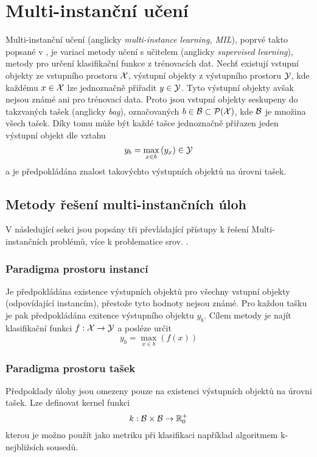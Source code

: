 \chapter{Multi-instanční učení}
Multi-instanční učení (anglicky \textenglish{\textit{multi-instance learning, MIL}}), poprvé takto popsané v \cite{dietterich_solving_1997}, je variací metody učení s učitelem (anglicky \textenglish{\textit{supervised learning}}), metody pro určení klasifikační funkce z trénovacích dat. Nechť existují vstupní objekty ze vstupního prostoru \( \mathcal X \), výstupní objekty z výstupního prostoru \( \mathcal Y \), kde každému \( x \in \mathcal X \) lze jednoznačně přiřadit \( y \in \mathcal Y \). Tyto výstupní objekty avšak nejsou známé ani pro trénovací data. Proto jsou vstupní objekty seskupeny do takzvaných tašek (anglicky \textenglish{\textit{bag}}), označovaných \( b \in \mathcal B \subset \mathcal P ( \mathcal X ) \), kde \( \mathcal B \) je množina všech tašek. Díky tomu může být každé tašce jednoznačně přiřazen jeden výstupní objekt dle vztahu
\begin{equation}\label{baglabel}
	y_b = \max_{x \in b} \left( y_x \right) \in \mathcal Y
\end{equation}
a je předpokládána znalost takovýchto výstupních objektů na úrovni tašek.

\section{Metody řešení multi-instančních úloh}

V následující sekci jsou popsány tři převládající přístupy k řešení Multi-instančních problémů, více k problematice srov. \cite{pevny_using_2016}.

\subsection{Paradigma prostoru instancí}
Je předpokládána existence výstupních objektů pro všechny vstupní objekty (odpovídající instancím), přestože tyto hodnoty nejsou známé. Pro každou tašku je pak předpokládána exitence výstupního objektu \( y_b \). Cílem metody je najít klasifikační funkci \( f : \mathcal X \to \mathcal Y \) a posléze určit
\begin{equation}
	y_b = \max_{x \in b} \left( f \left( x \right) \right)
\end{equation}

\subsection{Paradigma prostoru tašek}
Předpoklady úlohy jsou omezeny pouze na existenci výstupních objektů na úrovni tašek. Lze definovat kernel funkci
\begin{equation}
	k : \mathcal B \times \mathcal B \to \mathbb R_0^+
\end{equation}
kterou je možno použít jako metriku při klasifikaci například algoritmem k-nejbližsích sousedů.


